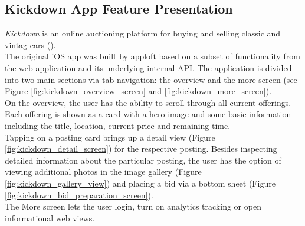 \subsection{Kickdown App Feature Presentation} \label{section:kickdown_feature_presentation}
\textit{Kickdown} is an online auctioning platform for buying and selling classic and vintag cars (\cite{Kickdown2021}).\\
The original iOS app was built by apploft based on a subset of functionality from the web application and its underlying internal API.
The application is divided into two main sections via tab navigation: the overview and the more screen (see Figure \ref{fig:kickdown_overview_screen} and \ref{fig:kickdown_more_screen}).\\
On the overview, the user has the ability to scroll through all current offerings. Each offering is shown as a card with a hero image 
and some basic information including the title, location, current price and remaining time.\\
Tapping on a posting card brings up a detail view (Figure \ref{fig:kickdown_detail_screen}) for the respective posting.
Besides inspecting detailed information about the particular posting, the user has the option of viewing additional photos in the image gallery (Figure \ref{fig:kickdown_gallery_view}) and placing a bid via a bottom sheet (Figure \ref{fig:kickdown_bid_preparation_screen}).\\
The More screen lets the user login, turn on analytics tracking or open informational web views.

